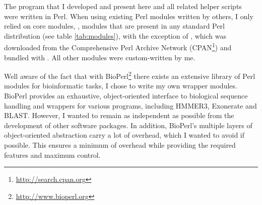 The program \pname that I developed and present here and all related helper
scripts were written in Perl. When using existing Perl modules written by
others, I only relied on core modules, \ie, modules that are present in any
standard Perl distribution (see table \ref{tab:modules}), with the exception of
 \citep{shan2001}, which was downloaded from the Comprehensive
Perl Archive Network (CPAN\footnote{\url{http://search.cpan.org}}) and bundled
with \pname. All other modules were custom-written by me.



Well aware of the fact that with BioPerl\footnote{\url{http://www.bioperl.org}}
there exists an extensive library of Perl modules for bioinformatic tasks, I
chose to write my own wrapper modules. BioPerl provides an exhaustive,
object-oriented interface to biological sequence handling and wrappers for
various programs, including HMMER3, Exonerate and BLAST. However, I wanted
\pname to remain as independent as possible from the development of other
software packages. In addition, BioPerl's multiple layers of object-oriented
abstraction carry a lot of overhead, which I wanted to avoid if possible. This
ensures a minimum of overhead while providing the required features and maximum
control.
